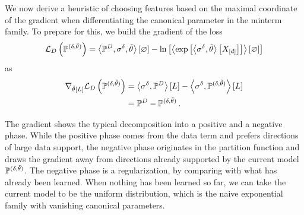 We now derive a heuristic of choosing features based on the maximal coordinate of the gradient when differentiating the canonical parameter in the minterm family.
To prepare for this, we build the gradient of the loss
\begin{align*}
    \mathcal{L}_{D}\left(\mathbb{P}^{(\delta, \tilde{\theta})}\right)
    = \left\langle \mathbb{P}^{D}, \sigma^{\delta}, \tilde{\theta}\right\rangle \left[ \varnothing \right] - \ln \left[ \left\langle \mathrm{exp}\left[\left\langle \sigma^{\delta}, \tilde{\theta}\right\rangle \left[ X_{[d]} \right]\right]\right\rangle \left[ \varnothing \right] \right]
\end{align*}
as
\begin{align*}
    \nabla_{\tilde{\theta}\left[L\right]} \mathcal{L}_{D}\left(\mathbb{P}^{(\delta, \tilde{\theta})}\right)
    &= \left\langle \sigma^{\delta},\mathbb{P}^{D}\right\rangle \left[ L \right] - \left\langle \sigma^{\delta},\mathbb{P}^{(\delta, \tilde{\theta})}\right\rangle \left[ L \right] \\
    &= \mathbb{P}^{D} - \mathbb{P}^{(\delta, \tilde{\theta})} \, .
\end{align*}



The gradient shows the typical decomposition into a positive and a negative phase.
While the positive phase comes from the data term and prefers directions of large data support, the negative phase originates in the partition function and draws the gradient away from directions already supported by the current model $\mathbb{P}^{(\delta, \tilde{\theta})}$.
The negative phase is a regularization, by comparing with what has already been learned.
When nothing has been learned so far, we can take the current model to be the uniform distribution, which is the naive exponential family with vanishing canonical parameters.


